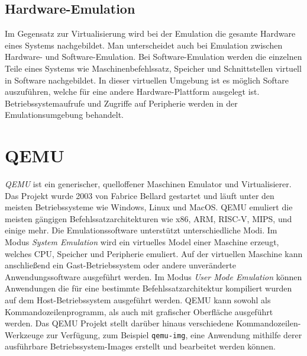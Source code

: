 \subsection{Hardware-Emulation}

Im Gegensatz zur Virtualisierung wird bei der Emulation die gesamte Hardware
eines Systems nachgebildet.
Man unterscheidet auch bei Emulation zwischen Hardware- und Software-Emulation.
Bei Software-Emulation werden die einzelnen Teile eines Systems wie
Maschinenbefehlssatz, Speicher und Schnittstellen virtuell in Software
nachgebildet\cite{BSKompakt_Virt}.
In dieser virtuellen Umgebung ist es möglich Softare auszuführen, welche
für eine andere Hardware-Plattform ausgelegt ist\cite{BSKompakt_Virt}.
Betriebssystemaufrufe und Zugriffe auf Peripherie werden in der
Emulationsumgebung behandelt.


\section{QEMU}

\textit{QEMU} ist ein generischer, quelloffener Maschinen Emulator und
Virtualisierer\cite{QemuAbout}.
Das Projekt wurde 2003 von Fabrice Bellard gestartet und läuft unter den
meisten Betriebssysteme wie Windows, Linux und MacOS.
QEMU emuliert die meisten gängigen Befehlssatzarchitekturen wie x86, ARM,
RISC-V, MIPS, und einige mehr\cite{WikiQemu}.
Die Emulationssoftware unterstützt unterschiedliche Modi.
Im Modus \textit{System Emulation} wird ein virtuelles Model einer Maschine
erzeugt, welches CPU, Speicher und Peripherie emuliert.
Auf der virtuellen Maschine kann anschließend ein Gast-Betriebssystem oder
andere unveränderte Anwendungssoftware ausgeführt werden.
\newline
Im Modus \textit{User Mode Emulation} können Anwendungen die für eine bestimmte
Befehlssatzarchitektur kompiliert wurden auf dem Host-Betriebssystem ausgeführt
werden.
\newline
QEMU kann sowohl als Kommandozeilenprogramm, als auch mit grafischer Oberfläche
ausgeführt werden.
Das QEMU Projekt stellt darüber hinaus verschiedene Kommandozeilen-Werkzeuge
zur Verfügung, zum Beispiel \texttt{qemu-img}, eine Anwendung mithilfe derer
ausführbare Betriebssystem-Images erstellt und bearbeitet werden können.


